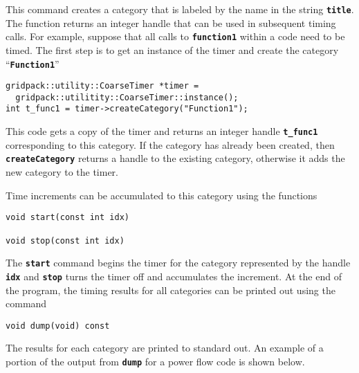 This command creates a category that is labeled by the name in the string \texttt{\textbf{title}}. The function returns an integer handle that can be used in subsequent timing calls. For example, suppose that all calls to \texttt{\textbf{function1}} within a code need to be timed. The first step is to get an instance of the timer and create the category ``\texttt{\textbf{Function1}}''

{
\color{red}
\begin{Verbatim}[fontseries=b]
gridpack::utility::CoarseTimer *timer =
  gridpack::utilitity::CoarseTimer::instance();
int t_func1 = timer->createCategory("Function1");
\end{Verbatim}
}

This code gets a copy of the timer and returns an integer handle \texttt{\textbf{t\_func1}} corresponding to this category. If the category has already been created, then \texttt{\textbf{createCategory}} returns a handle to the existing category, otherwise it adds the new category to the timer.

Time increments can be accumulated to this category using the functions

{
\color{red}
\begin{Verbatim}[fontseries=b]
void start(const int idx)

void stop(const int idx)
\end{Verbatim}
}

The \texttt{\textbf{start}} command begins the timer for the category represented by the handle \texttt{\textbf{idx}} and \texttt{\textbf{stop}} turns the timer off and accumulates the increment.
At the end of the program, the timing results for all categories can be printed out using the command

{
\color{red}
\begin{Verbatim}[fontseries=b]
void dump(void) const
\end{Verbatim}
}

The results for each category are printed to standard out. An example of a portion of the output from \texttt{\textbf{dump}} for a power flow code is shown below.

